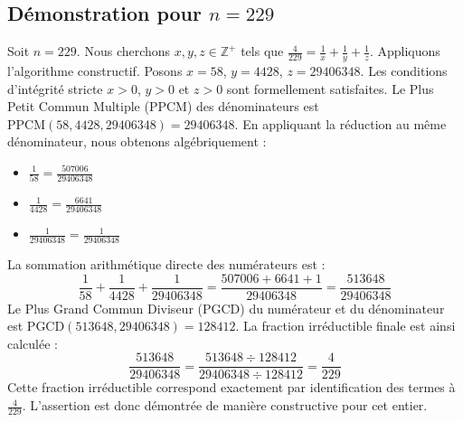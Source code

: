 \documentclass[11pt,a4paper]{article}
\begin{document}
\subsection{Démonstration pour $n = 229$}
Soit $n = 229$. Nous cherchons $x, y, z \in \mathbb{Z}^{+}$ tels que $\frac{4}{229} = \frac{1}{x} + \frac{1}{y} + \frac{1}{z}$.
Appliquons l'algorithme constructif. Posons $x = 58$, $y = 4428$, $z = 29406348$.
Les conditions d'intégrité stricte $x > 0$, $y > 0$ et $z > 0$ sont formellement satisfaites.
Le Plus Petit Commun Multiple (PPCM) des dénominateurs est $\text{PPCM}(58, 4428, 29406348) = 29406348$.
En appliquant la réduction au même dénominateur, nous obtenons algébriquement :
\begin{itemize}
    \item $\frac{1}{58} = \frac{507006}{29406348}$
    \item $\frac{1}{4428} = \frac{6641}{29406348}$
    \item $\frac{1}{29406348} = \frac{1}{29406348}$
\end{itemize}
La sommation arithmétique directe des numérateurs est :
$$ \frac{1}{58} + \frac{1}{4428} + \frac{1}{29406348} = \frac{507006 + 6641 + 1}{29406348} = \frac{513648}{29406348} $$
Le Plus Grand Commun Diviseur (PGCD) du numérateur et du dénominateur est $\text{PGCD}(513648, 29406348) = 128412$.
La fraction irréductible finale est ainsi calculée :
$$ \frac{513648}{29406348} = \frac{513648 \div 128412}{29406348 \div 128412} = \frac{4}{229} $$
Cette fraction irréductible correspond exactement par identification des termes à $\frac{4}{229}$. L'assertion est donc démontrée de manière constructive pour cet entier.
\end{document}
